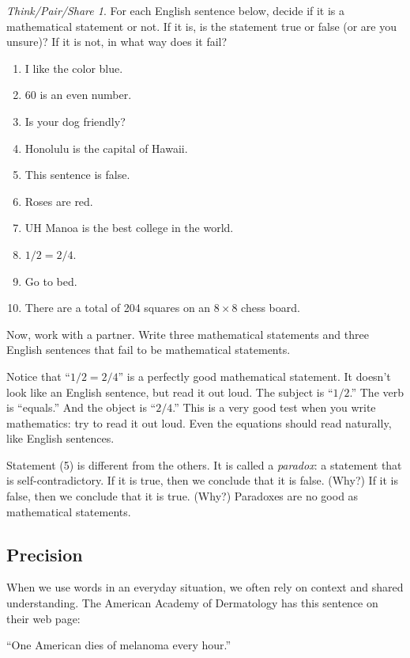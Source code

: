 \documentclass[10pt, reqno]{amsart}
\theoremstyle{remark}
\newtheorem*{thinkpair*}{Think/Pair/Share}
\theoremstyle{definition}
\numberwithin{equation}{section}  %
\begin{document}
\begin{thinkpair*}
For each English sentence below, decide if it is a mathematical statement or not.  If it is, is the statement true or false (or are you unsure)?  If it is not, in what way does it fail?

\begin{enumerate}
\item
I like the color blue.
\item
$60$ is an even number.
\item
Is your dog friendly?
\item
Honolulu is the capital of Hawaii.
\item
This sentence is false.
\item
Roses are red.
\item
UH Manoa is the best college in the world.
\item
$1/2 = 2/4$.
\item
Go to bed.
\item
There are a total of 204 squares on an $8 \times 8$ chess board.
\end{enumerate}

Now, work with a partner.  Write three mathematical statements and three English sentences that fail to be mathematical statements.
\end{thinkpair*}

Notice that ``$1/2 = 2/4$'' is a perfectly good mathematical statement.  It doesn't look like an English sentence, but read it out loud.  The subject is ``$1/2$.'' The verb is ``equals.''  And the object is ``$2/4$.''  This is a very good test when you write mathematics: try to read it out loud.  Even the equations should read naturally, like English sentences. 

Statement (5) is different from the others.  It is called a \emph{paradox}: a statement that is self-contradictory.  If it is true, then we conclude that it is false.  (Why?)  If it is false, then we conclude that it is true.  (Why?)  Paradoxes are no good as mathematical statements.  

\subsection{Precision}
When we use words in an everyday situation, we often rely on context and shared understanding.
The American Academy of Dermatology has this sentence on their web page: 
\begin{center}
``One American dies of melanoma every hour.''
\end{center}
\end{document}

